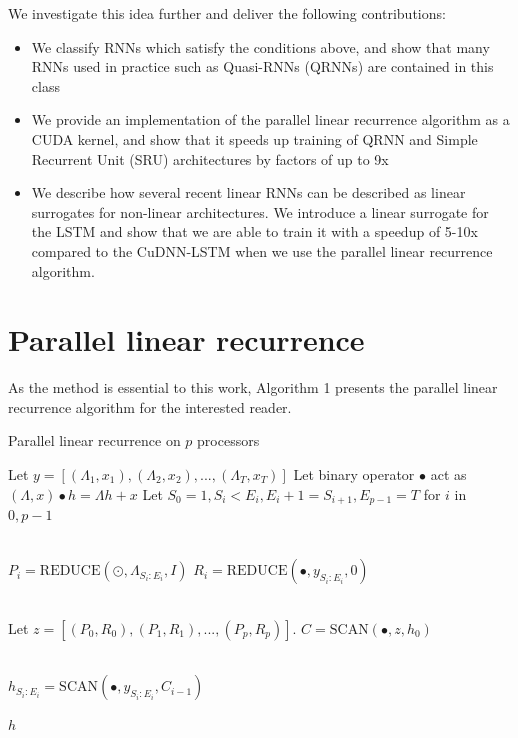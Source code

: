\documentclass{article}
\providecommand{\scan}{\text{SCAN}}
\providecommand{\reduce}{\text{REDUCE}}
\begin{document}
We investigate this idea further and deliver the following contributions:
\begin{itemize}
\item{We classify RNNs which satisfy the conditions above, and
    show that many RNNs used in practice such as Quasi-RNNs (QRNNs) \cite{bradbury2017quasi} are
    contained in this class}
\item{We provide an implementation of the parallel linear recurrence
    algorithm as a CUDA kernel, and show that it speeds up training of
    QRNN and Simple Recurrent Unit (SRU) \cite{lei2017} architectures by factors of up to 9x}
\item{We describe how several recent linear RNNs can be described as
    linear surrogates for non-linear architectures. We introduce a linear
    surrogate for the LSTM and show that we are able to train it
    with a speedup of 5-10x compared to the CuDNN-LSTM when we use the
    parallel linear recurrence algorithm.}
\end{itemize}

\section{Parallel linear recurrence}
As the method is
essential to this work, Algorithm 1 presents the parallel linear recurrence
algorithm for the interested reader.
\begin{algorithm}
  \label{alg:plr}
\caption{Parallel linear recurrence on $p$ processors}
\begin{algorithmic}[1]
  \State Let $y = [(\Lambda_1, x_1), (\Lambda_2, x_2), ..., (\Lambda_T, x_T)]$
  \State Let binary operator $\bullet$ act as $(\Lambda, x) \bullet h = \Lambda h + x$
  \State Let $S_0=1, S_i < E_i, E_i + 1 = S_{i+1}, E_{p-1}=T$ for $i$ in $0,p-1$

  \\
    \State $P_i = \reduce(\odot, \Lambda_{S_i:E_i}, I)$
    \State $R_i = \reduce(\bullet, y_{S_i:E_i}, 0)$
  \EndParFor

  \\
  \State Let $z = [(P_0, R_0), (P_1, R_1), ..., (P_p, R_p)]$.
  \State $C = \scan(\bullet, z, h_0)$   

  \\
    \State $h_{S_i:E_i} = \scan(\bullet, y_{S_i:E_i}, C_{i-1})$
  \EndParFor

  \State \Return $h$
\end{algorithmic}
\end{algorithm}
\end{document}
